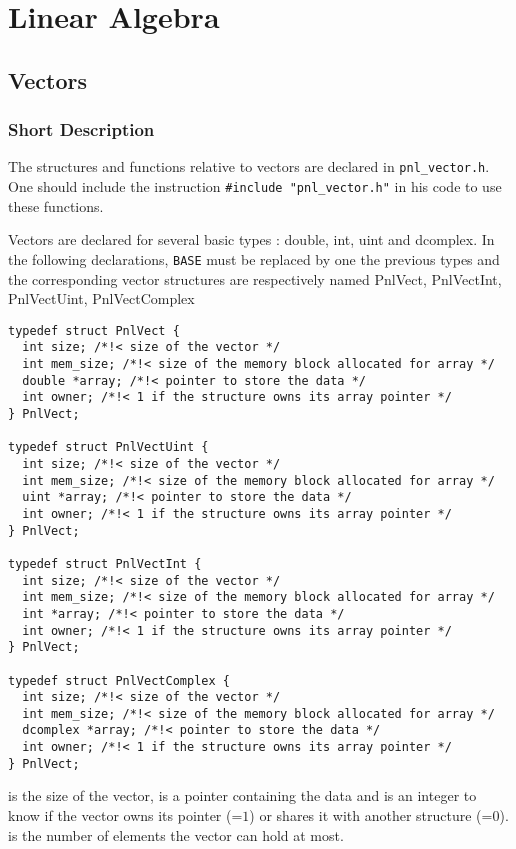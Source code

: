 \section{Linear Algebra}


\subsection{Vectors}
\subsubsection{Short Description}

The structures and functions relative to vectors are declared in
\verb!pnl_vector.h!. One should include the instruction
\verb!#include "pnl_vector.h"! in his code to use these functions.


Vectors are declared for several basic types : double, int, uint and
dcomplex. In the following declarations, {\tt BASE} must be replaced by one
the previous types and the corresponding vector structures are respectively
named PnlVect, PnlVectInt, PnlVectUint, PnlVectComplex
\begin{verbatim}
typedef struct PnlVect {
  int size; /*!< size of the vector */
  int mem_size; /*!< size of the memory block allocated for array */
  double *array; /*!< pointer to store the data */
  int owner; /*!< 1 if the structure owns its array pointer */
} PnlVect;

typedef struct PnlVectUint {
  int size; /*!< size of the vector */ 
  int mem_size; /*!< size of the memory block allocated for array */
  uint *array; /*!< pointer to store the data */
  int owner; /*!< 1 if the structure owns its array pointer */
} PnlVect;

typedef struct PnlVectInt {
  int size; /*!< size of the vector */ 
  int mem_size; /*!< size of the memory block allocated for array */
  int *array; /*!< pointer to store the data */
  int owner; /*!< 1 if the structure owns its array pointer */
} PnlVect;

typedef struct PnlVectComplex {
  int size; /*!< size of the vector */ 
  int mem_size; /*!< size of the memory block allocated for array */
  dcomplex *array; /*!< pointer to store the data */
  int owner; /*!< 1 if the structure owns its array pointer */
} PnlVect;
\end{verbatim}
 is the size of the vector,  is a pointer containing the
data and  is an integer to know if the vector owns its 
pointer (=$1$) or shares it with another structure (=$0$).
 is the number of elements the vector can hold at most.


